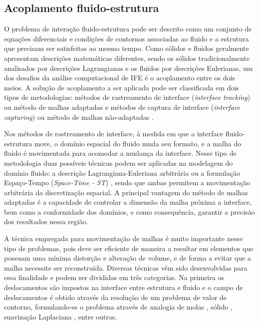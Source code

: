 \documentclass[tese_patricia.tex]{subfiles}
\begin{document}
\subsection{Acoplamento fluido-estrutura}
\label{couplingsection}


O problema de interação fluido-estrutura pode ser descrito como um conjunto de equações diferenciais e condições de contornos associadas ao fluido e a estrutura que precisam ser satisfeitas ao mesmo tempo. Como sólidos e fluidos geralmente apresentam descrições matemáticas diferentes, sendo os sólidos tradicionalmente analisados por descrições Lagrangianas e os fluidos por descrições Eulerianas, um dos desafios da análise computacional de IFE é o acoplamento entre os dois meios. A solução de acoplamento a ser aplicada pode ser classificada em dois tipos de metodologias: métodos de rastreamento de interface (\textit{interface tracking}) ou método de malhas adaptadas e métodos de captura de interface (\textit{interface capturing}) ou método de malhas não-adaptadas \cite{Houetal:2012,BazilevsTT:2013b}.

Nos métodos de rastreamento de interface, à medida em que a interface fluido-estrutura move, o domínio espacial do fluido muda seu formato, e a malha do fluido é movimentada para acomodar a mudança da interface. Nesse tipo de metodologia duas possíveis técnicas podem ser aplicadas na modelagem do domínio fluido: a descrição Lagrangiana-Euleriana arbitrária \cite{HughesLZ:1981,DoneaGH:1982,KanchiM:2007} ou a formulação Espaço-Tempo (\textit{Space-Time - ST}) \cite{TezduyarBL:1992b,TezduyarBML:1992c,TakizawaT:2012}, sendo que ambas permitem a movimentação arbitrária da discretização espacial. A principal vantagem do método de malhas adaptadas é a capacidade de controlar a dimensão da malha próxima a interface, bem como a conformidade dos domínios, e como consequência, garantir a precisão dos resultados nessa região.

A técnica empregada para movimentação de malhas é muito importante nesse tipo de problemas, pois deve ser eficiente de maneira a resultar em elementos que possuam uma mínima distorção e alteração de volume, e de forma a evitar que a malha necessite ser reconstruída. Diversas técnicas vêm sido desenvolvidas para essa finalidade e podem ser divididas em três categorias. Na primeira os deslocamentos são impostos na interface entre estrutura e fluido e o campo de deslocamentos é obtido através da resolução de um problema de valor de contorno, formulando-se o problema através de analogia de molas \cite{BottassoDS:2005}, sólido \cite{JohnsonT:1994,SteinTB:2004}, suavização Laplaciana \cite{KanchiM:2007}, entre outras.
\end{document}
